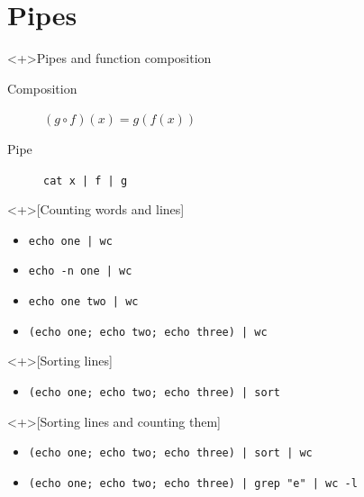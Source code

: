 \section{Pipes}

\begin{frame}[fragile]
  \begin{block}<+>{Pipes and function composition}
    \begin{description}
      \item[Composition] \(
          (g \circ f)(x) = g(f(x))
        \)
      \item[Pipe] \lstinline{cat x | f | g}
    \end{description}
  \end{block}

  \begin{example}<+>[Counting words and lines]
    \begin{itemize}
      \item \lstinline{echo one | wc}
      \item \lstinline{echo -n one | wc}
      \item \lstinline{echo one two | wc}
      \item \lstinline{(echo one; echo two; echo three) | wc}
    \end{itemize}
  \end{example}
\end{frame}

\begin{frame}[fragile]
  \begin{example}<+>[Sorting lines]
    \begin{itemize}
      \item \lstinline{(echo one; echo two; echo three) | sort}
    \end{itemize}
  \end{example}

  \begin{example}<+>[Sorting lines and counting them]
    \begin{itemize}
      \item \lstinline{(echo one; echo two; echo three) | sort | wc}
    \end{itemize}
  \end{example}
\end{frame}

\begin{frame}[fragile]
  \begin{example}
    \begin{itemize}
      \item \lstinline{(echo one; echo two; echo three) | grep "e" | wc -l}
    \end{itemize}
  \end{example}
\end{frame}


